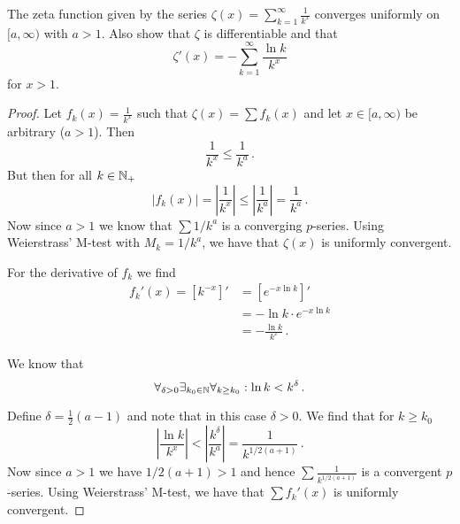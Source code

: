 \documentclass[week=12]{homework}
\date{\today}
\begin{document}
    \maketitle
    \thispagestyle{empty}
    \newpage
    \begin{questions}
		\let\firstquestion\question
		\renewcommand*{\question}{\vspace{7mm}\firstquestion}
        \firstquestion
        \begin{inlinetoprove}
        	The zeta function given by the series $\zeta(x) = \sum_{k=1}^{\infty} \frac{1}{k^x}$ converges uniformly on $[a,\infty)$ with $a > 1$. Also show that $\zeta$ is differentiable and that 
        	\[
        	\zeta'(x) = - \sum_{k=1}^{\infty} \frac{\ln k}{k^x}
        	\]
        	for $x > 1$.
        \end{inlinetoprove}
		
		\begin{proof}
			Let $f_k(x) = \frac{1}{k^x} $ such that $\zeta(x)  = \sum f_k(x)$ and let $x \in [a,\infty)$ be arbitrary ($a>1$). Then
			\[
				\frac{1}{k^x} \leq \frac{1}{k^a}\,.
			\]
			But then for all $k \in \mathbb{N}_+$
			\[
				\left| f_k(x) \right| = \left| \frac{1}{k^x} \right| \leq \left| \frac{1}{k^a} \right| = \frac{1}{k^a}\,.
			\]
			Now since $a > 1$ we know that $\sum 1/k^a$ is a converging $p$-series. Using Weierstrass' M-test with $M_k = 1/k^a$, we have that $\zeta(x)$ is uniformly convergent.
		
			For the derivative of $f_k$ we find
			\begin{align*}
				f_k'(x) = \left[k^{-x}\right]' &= \left[ e^{-x\ln k} \right]' \\
				&= -\ln k \cdot e^{-x\ln k} \\
				&= -\frac{\ln k}{k^x}\,.
			\end{align*}
			
			We know that
			\[
				\forall_{\delta > 0}\exists_{k_0 \in \mathbb{N}}\forall_{k \geq k_0}: \ln k < k^\delta\,.
			\]
			
			Define $\delta = \frac{1}{2}(a-1)$ and note that in this case $\delta > 0$. We find that for $k \geq k_0$
			\[
				\left| \frac{\ln k}{k^x} \right| < \left| \frac{k^\delta}{k^a} \right| = \frac{1}{k^{1/2(a+1)}}\,.
			\]
			Now since $a > 1$ we have $1/2(a+1) > 1$ and hence $\sum \frac{1}{k^{1/2(a+1)}}$ is a convergent $p$-series. Using Weierstrass' M-test, we have that $\sum f_k'(x)$ is uniformly convergent.
			

\end{proof}
\end{questions}
\end{document}

